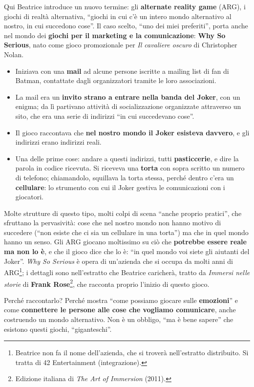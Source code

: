 Qui Beatrice introduce un nuovo termine: gli \textbf{alternate reality game}
(ARG), i giochi di realtà alternativa, ``giochi in cui c'è un intero mondo
alternativo al nostro, in cui succedono cose''. Il caso scelto, ``uno dei miei
preferiti'', porta anche nel mondo dei \textbf{giochi per il marketing e la
comunicazione}: \textbf{Why So Serious}, nato come gioco promozionale per
\emph{Il cavaliere oscuro} di Christopher Nolan.
\begin{itemize}
  \item Iniziava con una \textbf{mail} ad alcune persone iscritte a mailing
        list di fan di Batman, contattate dagli organizzatori tramite le loro
        associazioni.
  \item La mail era un \textbf{invito strano a entrare nella banda del Joker},
        con un enigma; da lì partivano attività di socializzazione organizzate
        attraverso un sito, che era una serie di indirizzi ``in cui succedevano
        cose''.
  \item Il gioco raccontava che \textbf{nel nostro mondo il Joker esisteva
        davvero}, e gli indirizzi erano indirizzi reali.
  \item Una delle prime cose: andare a questi indirizzi, tutti
        \textbf{pasticcerie}, e dire la parola in codice ricevuta. Si riceveva
        una \textbf{torta} con sopra scritto un numero di telefono; chiamandolo,
        squillava la torta stessa, perché dentro c'era un \textbf{cellulare}:
        lo strumento con cui il Joker gestiva le comunicazioni con i giocatori.
\end{itemize}
Molte strutture di questo tipo, molti colpi di scena ``anche proprio pratici'',
che sfruttano la pervasività: cose che nel nostro mondo non hanno motivo di
succedere (``non esiste che ci sia un cellulare in una torta'') ma che in quel
mondo hanno un senso. Gli ARG giocano moltissimo su ciò che \textbf{potrebbe
essere reale ma non lo è}, e che il gioco dice che lo è: ``in quel mondo voi
siete gli aiutanti del Joker''. \emph{Why So Serious} è opera di un'azienda che
si occupa da molti anni di ARG\footnote{Beatrice non fa il nome dell'azienda,
che si troverà nell'estratto distribuito. Si tratta di 42 Entertainment
(integrazione).}; i dettagli sono nell'estratto che Beatrice caricherà, tratto
da \emph{Immersi nelle storie} di \textbf{Frank Rose}\footnote{Edizione
italiana di \emph{The Art of Immersion} (2011).}, che racconta proprio l'inizio
di questo gioco.

Perché raccontarlo? Perché mostra ``come possiamo giocare sulle
\textbf{emozioni}'' e come \textbf{connettere le persone alle cose che vogliamo
comunicare}, anche costruendo un mondo alternativo. Non è un obbligo, ``ma è bene
sapere'' che esistono questi giochi, ``giganteschi''.

